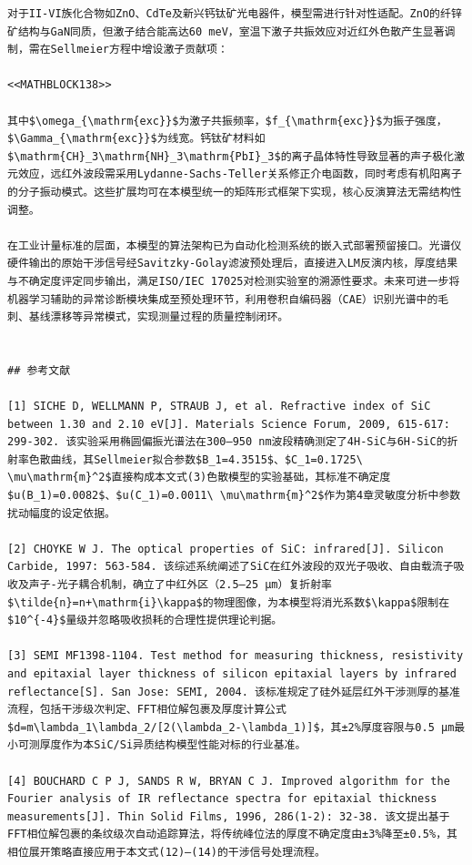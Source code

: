 \documentclass{mcmthesis}
\begin{document}
\begin{table}[htbp]
\begin{lstlisting}
对于II-VI族化合物如ZnO、CdTe及新兴钙钛矿光电器件，模型需进行针对性适配。ZnO的纤锌矿结构与GaN同质，但激子结合能高达60 meV，室温下激子共振效应对近红外色散产生显著调制，需在Sellmeier方程中增设激子贡献项：

<<MATHBLOCK138>>

其中$\omega_{\mathrm{exc}}$为激子共振频率，$f_{\mathrm{exc}}$为振子强度，$\Gamma_{\mathrm{exc}}$为线宽。钙钛矿材料如$\mathrm{CH}_3\mathrm{NH}_3\mathrm{PbI}_3$的离子晶体特性导致显著的声子极化激元效应，远红外波段需采用Lydanne-Sachs-Teller关系修正介电函数，同时考虑有机阳离子的分子振动模式。这些扩展均可在本模型统一的矩阵形式框架下实现，核心反演算法无需结构性调整。

在工业计量标准的层面，本模型的算法架构已为自动化检测系统的嵌入式部署预留接口。光谱仪硬件输出的原始干涉信号经Savitzky-Golay滤波预处理后，直接进入LM反演内核，厚度结果与不确定度评定同步输出，满足ISO/IEC 17025对检测实验室的溯源性要求。未来可进一步将机器学习辅助的异常诊断模块集成至预处理环节，利用卷积自编码器（CAE）识别光谱中的毛刺、基线漂移等异常模式，实现测量过程的质量控制闭环。


## 参考文献

[1] SICHE D, WELLMANN P, STRAUB J, et al. Refractive index of SiC between 1.30 and 2.10 eV[J]. Materials Science Forum, 2009, 615-617: 299-302. 该实验采用椭圆偏振光谱法在300–950 nm波段精确测定了4H-SiC与6H-SiC的折射率色散曲线，其Sellmeier拟合参数$B_1=4.3515$、$C_1=0.1725\ \mu\mathrm{m}^2$直接构成本文式(3)色散模型的实验基础，其标准不确定度$u(B_1)=0.0082$、$u(C_1)=0.0011\ \mu\mathrm{m}^2$作为第4章灵敏度分析中参数扰动幅度的设定依据。

[2] CHOYKE W J. The optical properties of SiC: infrared[J]. Silicon Carbide, 1997: 563-584. 该综述系统阐述了SiC在红外波段的双光子吸收、自由载流子吸收及声子-光子耦合机制，确立了中红外区（2.5–25 μm）复折射率$\tilde{n}=n+\mathrm{i}\kappa$的物理图像，为本模型将消光系数$\kappa$限制在$10^{-4}$量级并忽略吸收损耗的合理性提供理论判据。

[3] SEMI MF1398-1104. Test method for measuring thickness, resistivity and epitaxial layer thickness of silicon epitaxial layers by infrared reflectance[S]. San Jose: SEMI, 2004. 该标准规定了硅外延层红外干涉测厚的基准流程，包括干涉级次判定、FFT相位解包裹及厚度计算公式$d=m\lambda_1\lambda_2/[2(\lambda_2-\lambda_1)]$，其±2%厚度容限与0.5 μm最小可测厚度作为本SiC/Si异质结构模型性能对标的行业基准。

[4] BOUCHARD C P J, SANDS R W, BRYAN C J. Improved algorithm for the Fourier analysis of IR reflectance spectra for epitaxial thickness measurements[J]. Thin Solid Films, 1996, 286(1-2): 32-38. 该文提出基于FFT相位解包裹的条纹级次自动追踪算法，将传统峰位法的厚度不确定度由±3%降至±0.5%，其相位展开策略直接应用于本文式(12)–(14)的干涉信号处理流程。


\end{lstlisting}
\end{table}
\end{document}
